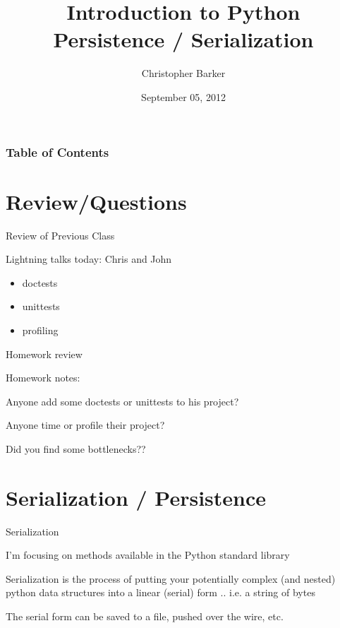 \documentclass{beamer}
\title[Intro to Python: Week 10]{Introduction  to Python \\ Persistence / Serialization}
\author{Christopher Barker}
\institute{UW Continuing Education / Isilon}
\date{September 05, 2012}
\begin{document}
\begin{frame}
  \titlepage
\end{frame}

\begin{frame}
\frametitle{Table of Contents}
  \tableofcontents
\end{frame}


\section{Review/Questions}

\begin{frame}{Review of Previous Class}

Lightning talks today: Chris and John

\begin{itemize}
  \item doctests
  \item unittests
  \item profiling
\end{itemize}

\end{frame}


\begin{frame}{Homework review}

{\Large Homework notes: }

\vfill
{\large Anyone add some doctests or unittests to his project?}

\vfill
{\large Anyone time or profile their project?}

\vfill
{\large Did you find some bottlenecks??}

\end{frame}

\section{Serialization / Persistence}

\begin{frame}[fragile]{Serialization}

\vfill
{\Large I'm focusing on methods available in the Python standard library}

\vfill
{\Large Serialization is the process of putting your potentially complex
(and nested) python data structures into a linear (serial) form .. i.e. a string of bytes}

\vfill
{\Large The serial form can be saved to a file, pushed over the wire, etc.}

\vfill

\end{frame} 
\end{document}
